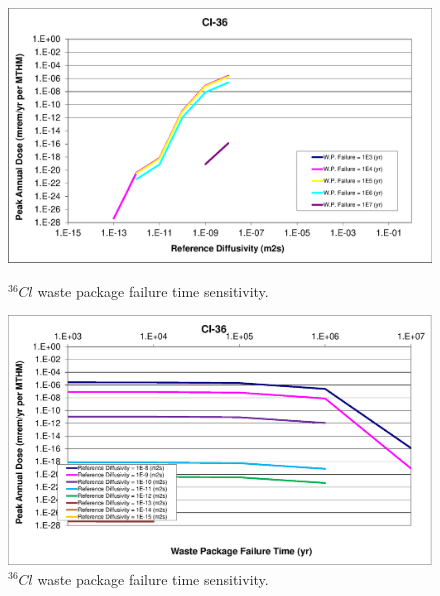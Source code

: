 \begin{figure}[ht]
\begin{minipage}[b]{0.45\linewidth}

\includegraphics[width=\linewidth]{./chapters/nuclide_sensitivity/clay/WPFailExtended/Cl-36.eps}
\caption{$^{36}Cl$ waste package failure time sensitivity. }
\label{fig:WPFailCl36}

\end{minipage}
\hspace{0.05\linewidth}
\begin{minipage}[b]{0.45\linewidth}

\includegraphics[width=\linewidth]{./chapters/nuclide_sensitivity/clay/WPFailExtended/Cl-36-WPFail.eps}
\caption{$^{36}Cl$ waste package failure time sensitivity. }
\label{fig:WPFailPuDaughters}

\end{minipage}
\end{figure}


